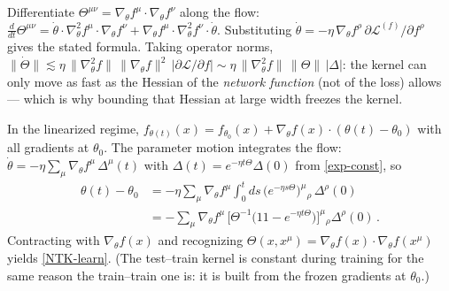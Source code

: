 \documentclass[11pt]{article}
\newcommand{\CL}{{\mathcal L}}
\newcommand{\pd}{\partial}
\begin{document}
\begin{solution}
Differentiate $\Theta^{\mu\nu} = \nabla_\theta f^\mu\cdot\nabla_\theta f^\nu$ along the flow:
$\frac{d}{dt}\Theta^{\mu\nu} = \dot\theta\cdot\nabla^2_\theta f^\mu\cdot \nabla_\theta f^\nu + \nabla_\theta f^\mu \cdot \nabla^2_\theta f^\nu\cdot\dot\theta$. Substituting $\dot\theta = -\eta\,\nabla_\theta f^\rho\, \pd\CL^{(f)}/\pd f^\rho$ gives the stated formula. Taking operator norms, $\|\dot\Theta\| \lesssim \eta\, \|\nabla^2_\theta f\|\,\|\nabla_\theta f\|^2\, |\pd\CL/\pd f| \sim \eta\,\|\nabla^2_\theta f\|\, \|\Theta\|\,|\Delta|$: the kernel can only move as fast as the Hessian of the \emph{network function} (not of the loss) allows --- which is why bounding that Hessian at large width freezes the kernel.
\end{solution}

\begin{solution}
In the linearized regime, $f_{\theta(t)}(x) = f_{\theta_0}(x) + \nabla_\theta f(x)\cdot(\theta(t)-\theta_0)$ with all gradients at $\theta_0$. The parameter motion integrates the flow: $\dot\theta = -\eta \sum_\mu \nabla_\theta f^\mu\, \Delta^\mu(t)$ with $\Delta(t) = e^{-\eta t \Theta}\Delta(0)$ from \eqref{exp-const}, so
\begin{equation*}
    \begin{aligned}
    \theta(t)-\theta_0 &= -\eta \sum_\mu \nabla_\theta f^\mu \int_0^t ds\, \big(e^{-\eta s \Theta}\big)^\mu{}_\rho\, \Delta^\rho(0) \\
    &= -\sum_\mu \nabla_\theta f^\mu\, \big[\Theta^{-1}\big(1\!\!1 - e^{-\eta t\Theta}\big)\big]^\mu{}_\rho \Delta^\rho(0)\,.
    \end{aligned}
\end{equation*}
Contracting with $\nabla_\theta f(x)$ and recognizing $\Theta(x,x^\mu) = \nabla_\theta f(x)\cdot\nabla_\theta f(x^\mu)$ yields \eqref{NTK-learn}. (The test--train kernel is constant during training for the same reason the train--train one is: it is built from the frozen gradients at $\theta_0$.)
\end{solution}
\end{document}
